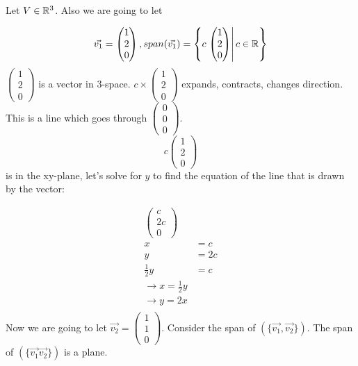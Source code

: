   \begin{problem}
    Let $V\in\mathbb{R}^3$. Also we are going to let

    \begin{equation}
      \vec{v_1}=\begin{pmatrix}
        1\\2\\0
      \end{pmatrix}
      ,span(\vec{v_1})=\left\{c\left.\begin{pmatrix}1\\2\\0\end{pmatrix}\right|c\in\mathbb{R}\right\}
    \end{equation}
    $\left(\begin{smallmatrix}1\\2\\0\end{smallmatrix}\right)$ is a vector in 3-space. $c\times\left(\begin{smallmatrix}1\\2\\0\end{smallmatrix}\right)$ expands, contracts, changes direction. This is a line which goes through $\left(\begin{smallmatrix}0\\0\\0\end{smallmatrix}\right)$.
    \begin{equation}
      c\begin{pmatrix}
        1\\2\\0 
      \end{pmatrix}
    \end{equation}
    is in the xy-plane, let's solve for $y$ to find the equation of the line that is drawn by the vector:

    \begin{align}
      \begin{pmatrix}
        c\\2c\\0
      \end{pmatrix}\\
      x&=c\\
      y&=2c\\
      \frac{1}{2}y&=c\\
      \to x=\frac{1}{2}y\\
      \to y=2x\\
    \end{align}
    Now we are going to let $\vec{v_2}=\left(\begin{smallmatrix}1\\1\\0\end{smallmatrix}\right)$. Consider the span of $(\{\vec{v_1},\vec{v_2}\})$. The span of $(\{\vec{v_1}\vec{v_2}\})$ is a plane.
  \end{problem}

